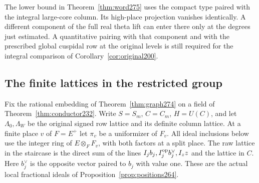 \documentclass[a4paper,11pt]{article}
\theoremstyle{definition}
\theoremstyle{remark}
\numberwithin{equation}{section}
\begin{document}
The lower bound in Theorem~\ref{thm:word275} uses the compact
type paired with the integral large-core column. Its high-place
projection vanishes identically. A different component of the
full real theta lift can enter there only at the degrees just
estimated. A quantitative pairing with that component and
with the prescribed global cuspidal row at the original
levels is still required for the integral comparison of
Corollary~\ref{cor:original200}.

\subsection{The finite lattices in the restricted group}\label{nav:IX-47}
Fix the rational embedding of Theorem~\ref{thm:graph274} on a
field of Theorem~\ref{thm:conductor232}. Write \(S=S_m\),
\(C=C_m\), \(H=U(C)\), and let \(\Lambda_0,\Lambda_W\) be the
original signed row lattice and its definite column lattice.
At a finite place \(v\) of \(F=E^+\) let \(\pi_v\) be a
uniformizer of \(F_v\). All ideal inclusions below use the
integer ring of \(E\otimes_F F_v\), with both factors at a
split place. The raw lattice in the staircase is the direct
sum of the lines \(I_j b_j,I_j^{\rm op}b_j^\vee,I_z z\) and
the lattice in \(C\). Here \(b_j^\vee\) is the opposite vector
paired to \(b_j\) with value one. These are the actual local
fractional ideals of Proposition~\ref{prop:positions264}.
\end{document}
